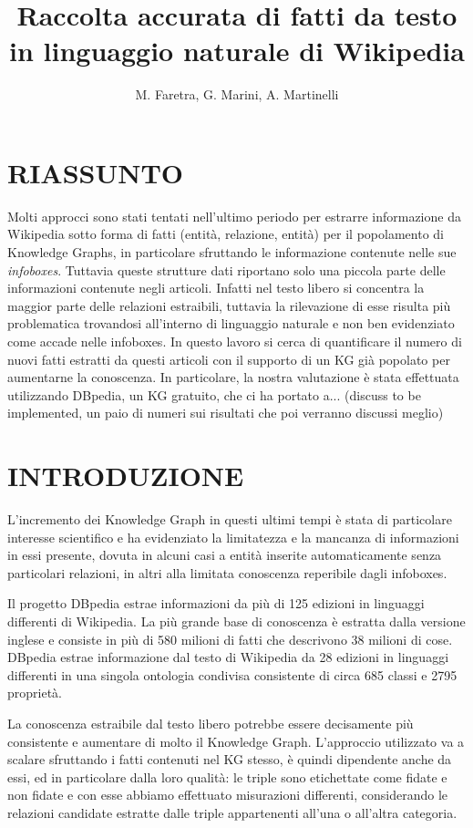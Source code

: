 \documentclass[10pt,a4paper,twocolumn]{article}
\author{M. Faretra, G. Marini, A. Martinelli}
\title{\textbf{Raccolta accurata di fatti da testo in linguaggio naturale di Wikipedia}}
\begin{document}
	
\maketitle
		
\section*{RIASSUNTO}
		
Molti approcci sono stati tentati nell'ultimo periodo per estrarre informazione da Wikipedia sotto forma di fatti (entità, relazione, entità) per il popolamento di Knowledge Graphs, in particolare sfruttando le informazione contenute nelle sue \textit{infoboxes}. Tuttavia queste strutture dati riportano solo una piccola parte delle informazioni contenute negli articoli. Infatti nel testo libero si concentra la maggior parte delle relazioni estraibili, tuttavia la rilevazione di esse risulta più problematica trovandosi all'interno di linguaggio naturale e non ben evidenziato come accade nelle infoboxes. In questo lavoro si cerca di quantificare il numero di nuovi fatti estratti da questi articoli con il supporto di un KG già popolato per aumentarne la conoscenza. In particolare, la nostra valutazione è stata effettuata utilizzando DBpedia, un KG gratuito, che ci ha portato a... (discuss to be implemented, un paio di numeri sui risultati che poi verranno discussi meglio)

\section{INTRODUZIONE} 

L'incremento dei Knowledge Graph in questi ultimi tempi è stata di particolare interesse scientifico e ha evidenziato la limitatezza e la mancanza di informazioni in essi presente, dovuta in alcuni casi a entità inserite automaticamente senza particolari relazioni, in altri alla limitata conoscenza reperibile dagli infoboxes.

Il progetto DBpedia estrae informazioni da più di 125 edizioni in linguaggi differenti di Wikipedia. La più grande base di conoscenza è estratta dalla versione inglese e consiste in più di 580 milioni di fatti che descrivono 38 milioni di cose. DBpedia estrae informazione dal testo di  Wikipedia da 28 edizioni in linguaggi differenti in una singola ontologia condivisa consistente di circa 685 classi e 2795 proprietà. 

La conoscenza estraibile dal testo libero potrebbe essere decisamente più consistente e aumentare di molto il Knowledge Graph. L'approccio utilizzato va a scalare sfruttando i fatti contenuti nel KG stesso, è quindi dipendente anche da essi, ed in particolare dalla loro qualità: le triple sono etichettate come fidate e non fidate e con esse abbiamo effettuato misurazioni differenti, considerando le relazioni candidate estratte dalle triple appartenenti all'una o all'altra categoria.
\end{document}
